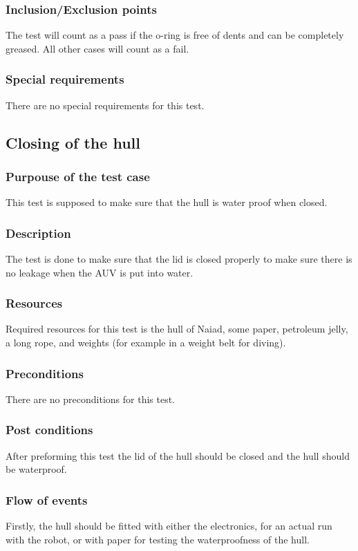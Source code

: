 \subsubsection*{Inclusion/Exclusion points}
The test will count as a pass if the o-ring is free of dents and can be completely greased. All other cases will count as a fail. 
\subsubsection*{Special requirements}
There are no special requirements for this test. 

\subsection{Closing of the hull}
\label{Hulltest}
\subsubsection*{Purpouse of the test case}
This test is supposed to make sure that the hull is water proof when closed. 
\subsubsection*{Description}
The test is done to make sure that the lid is closed properly to make sure there is no leakage when the AUV is put into water. 
\subsubsection*{Resources}
Required resources for this test is the hull of Naiad, some paper, petroleum jelly, a long rope, and weights (for example in a weight belt for diving). 
\subsubsection*{Preconditions}
There are no preconditions for this test. 
\subsubsection*{Post conditions}
After preforming this test the lid of the hull should be closed and the hull should be waterproof. 
\subsubsection*{Flow of events}
Firstly, the hull should be fitted with either the electronics, for an actual run with the robot, or with paper for testing the waterproofness of the hull. 

